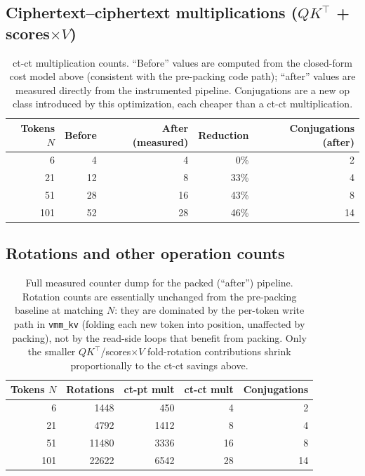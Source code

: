 \documentclass[11pt]{article}
\begin{document}
\subsection{Ciphertext--ciphertext multiplications ($QK^\top$ + scores$\times V$)}
\begin{table}[H]
\centering
\begin{tabular}{rrrrr}
\toprule
Tokens $N$ & Before & After (measured) & Reduction & Conjugations (after) \\
\midrule
6   & 4  & 4  & 0\%  & 2  \\
21  & 12 & 8  & 33\% & 4  \\
51  & 28 & 16 & 43\% & 8  \\
101 & 52 & 28 & 46\% & 14 \\
\bottomrule
\end{tabular}
\caption{ct-ct multiplication counts. ``Before'' values are computed from
the closed-form cost model above (consistent with the pre-packing code
path); ``after'' values are measured directly from the instrumented
pipeline. Conjugations are a new op class introduced by this optimization,
each cheaper than a ct-ct multiplication.}
\end{table}

\subsection{Rotations and other operation counts}
\begin{table}[H]
\centering
\begin{tabular}{rrrrr}
\toprule
Tokens $N$ & Rotations & ct-pt mult & ct-ct mult & Conjugations \\
\midrule
6   & 1448  & 450  & 4  & 2  \\
21  & 4792  & 1412 & 8  & 4  \\
51  & 11480 & 3336 & 16 & 8  \\
101 & 22622 & 6542 & 28 & 14 \\
\bottomrule
\end{tabular}
\caption{Full measured counter dump for the packed (``after'') pipeline.
Rotation counts are essentially unchanged from the pre-packing baseline at
matching $N$: they are dominated by the per-token write path in
\texttt{vmm\_kv} (folding each new token into position, unaffected by
packing), not by the read-side loops that benefit from packing. Only the
smaller $QK^\top$/scores$\times V$ fold-rotation contributions shrink
proportionally to the ct-ct savings above.}
\end{table}
\end{document}
